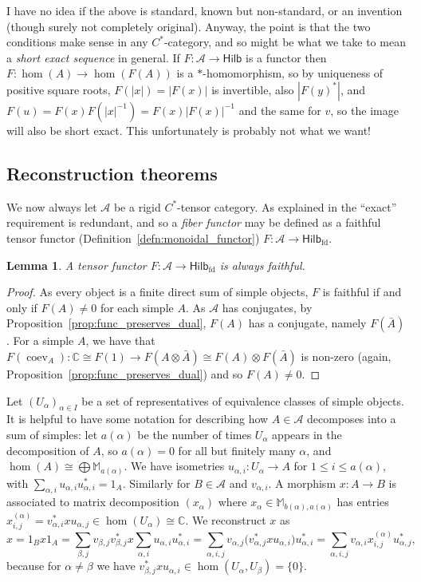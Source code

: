 \documentclass[a4paper,11pt]{article}
\theoremstyle{plain}
\newtheorem{lemma}[proposition]{Lemma}
\theoremstyle{remark}
\newcommand{\mc}[1]{\mathcal{#1}}
\newcommand{\catHilb}{\textsf{Hilb}}
\newcommand{\catHilbFD}{\textsf{Hilb}_{\text{fd}}}
\newcommand{\coev}{\operatorname{coev}}
\newcommand{\conj}[1]{\bar{#1}}
\begin{document}
I have no idea if the above is standard, known but non-standard, or an invention (though surely not completely original).  Anyway, the point is that the two conditions make sense in any $C^*$-category, and so might be what we take to mean a \emph{short exact sequence} in general.  If $F \colon \mc A \to \catHilb$ is a functor then $F\colon \hom(A) \to \hom(F(A))$ is a $*$-homomorphism, so by uniqueness of positive square roots, $F(|x|) = |F(x)|$ is invertible, also $|F(y)^*|$, and $F(u) = F(x) F(|x|^{-1}) = F(x) |F(x)|^{-1}$ and the same for $v$, so the image will also be short exact.  This unfortunately is probably not what we want!


\subsection{Reconstruction theorems}

We now always let $\mc A$ be a rigid $C^*$-tensor category.  As explained in \cite[Section~2.3]{NT_CQGsBook} the ``exact'' requirement is redundant, and so a \emph{fiber functor} may be defined as a faithful tensor functor (Definition~\ref{defn:monoidal_functor}) $F \colon \mc A \to \catHilbFD$.

\begin{lemma}
A tensor functor $F \colon \mc A \to \catHilbFD$ is always faithful.
\end{lemma}
\begin{proof}
As every object is a finite direct sum of simple objects, $F$ is faithful if and only if $F(A)\not=0$ for each simple $A$.  As $\mc A$ has conjugates, by Proposition~\ref{prop:func_preserves_dual}, $F(A)$ has a conjugate, namely $F(\conj A)$.  For a simple $A$, we have that $F(\coev_A) \colon \mathbb C \cong F(1)\to F(A\otimes\conj A) \cong F(A) \otimes F(\conj A)$ is non-zero (again, Proposition~\ref{prop:func_preserves_dual}) and so $F(A)\not=0$.
\end{proof}

Let $(U_\alpha)_{\alpha\in I}$ be a set of representatives of equivalence classes of simple objects.  It is helpful to have some notation for describing how $A\in\mc A$ decomposes into a sum of simples: let $a(\alpha)$ be the number of times $U_\alpha$ appears in the decomposition of $A$, so $a(\alpha)=0$ for all but finitely many $\alpha$, and $\hom(A) \cong \bigoplus \mathbb M_{a(\alpha)}$.  We have isometries $u_{\alpha,i} \colon U_\alpha \to A$ for $1\leq i\leq a(\alpha)$, with $\sum_{\alpha, i} u_{\alpha,i} u_{\alpha,i}^* = 1_A$.  Similarly for $B\in\mc A$ and $v_{\alpha,i}$.  A morphism $x \colon A \to B$ is associated to matrix decomposition $(x_\alpha)$ where $x_\alpha \in \mathbb M_{b(\alpha), a(\alpha)}$ has entries $x^{(\alpha)}_{i,j} = v_{\alpha,i}^* x u_{\alpha,j} \in \hom(U_\alpha) \cong \mathbb C$.  We reconstruct $x$ as
\[ x = 1_B x 1_A
= \sum_{\beta,j} v_{\beta,j} v_{\beta,j}^* x \sum_{\alpha, i} u_{\alpha,i} u_{\alpha,i}^*
= \sum_{\alpha,i,j} v_{\alpha,j} \bigl( v_{\alpha,j}^* x u_{\alpha,i} \bigr) u_{\alpha,i}^*
= \sum_{\alpha,i,j} v_{\alpha,i} x^{(\alpha)}_{i,j} u_{\alpha,j}^*, \]
because for $\alpha\not=\beta$ we have $v_{\beta,j}^* x u_{\alpha,i} \in \hom(U_\alpha, U_\beta) = \{0\}$.
\end{document}
